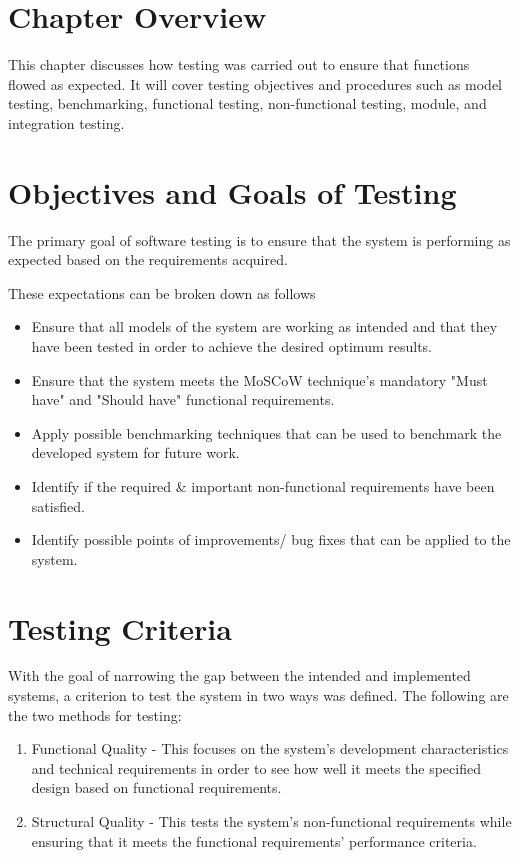 \section{Chapter Overview}
This chapter discusses how testing was carried out to ensure that functions flowed as expected. It will cover testing objectives and procedures such as model testing, benchmarking, functional testing, non-functional testing, module, and integration testing.

\section{Objectives and Goals of Testing}
The primary goal of software testing is to ensure that the system is performing as expected based on the requirements acquired.

These expectations can be broken down as follows
\begin{itemize}
\item Ensure that all models of the system are working as intended and that they have been tested in order to achieve the desired optimum results.
\item Ensure that the system meets the MoSCoW technique's mandatory "Must have" and "Should have" functional requirements.
\item Apply possible benchmarking techniques that can be used to benchmark the developed system for future work.
\item Identify if the required \& important non-functional requirements have been satisfied.
\item Identify possible points of improvements/ bug fixes that can be applied to the system.
\end{itemize}


\section{Testing Criteria}
With the goal of narrowing the gap between the intended and implemented systems, a criterion to test the system in two ways was defined. The following are the two methods for testing:
\begin{enumerate}
\item Functional Quality - This focuses on the system's development characteristics and technical requirements in order to see how well it meets the specified design based on functional requirements.
\item Structural Quality - This tests the system's non-functional requirements while ensuring that it meets the functional requirements' performance criteria.
\end{enumerate}


